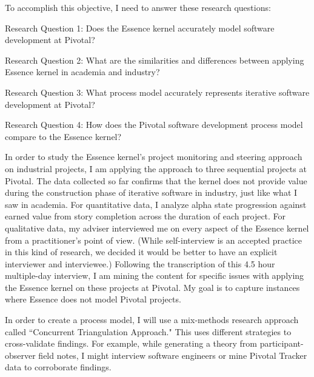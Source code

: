 \documentclass[preprint,12pt,3p]{elsarticle}
\begin{document}
To accomplish this objective, I need to answer these research questions:

Research Question 1: Does the Essence kernel accurately model software development at Pivotal? 

Research Question 2: What are the similarities and differences between applying Essence kernel in academia and industry? 

Research Question 3: What process model accurately represents iterative software development at Pivotal?

Research Question 4: How does the Pivotal software development process model compare to the Essence kernel? 

In order to study the Essence kernel's project monitoring and steering approach on industrial projects, I am applying the approach to three sequential projects at Pivotal. The data collected so far confirms that the kernel does not provide value during the construction phase of iterative software in industry, just like what I saw in academia. For quantitative data, I analyze alpha state progression against earned value from story completion across the duration of each project. For qualitative data, my adviser interviewed me on every aspect of the Essence kernel from a practitioner's point of view. (While self-interview is an accepted practice in this kind of research, we decided it would be better to have an explicit interviewer and interviewee.) Following the transcription of this 4.5 hour multiple-day interview, I am mining the content for specific issues with applying the Essence kernel on these projects at Pivotal. My goal is to capture instances where Essence does not model Pivotal projects. 

In order to create a process model, I will use a mix-methods research approach called ``Concurrent Triangulation Approach." This uses different strategies to cross-validate findings. For example, while generating a theory from participant-observer field notes, I might interview software engineers or mine Pivotal Tracker data to corroborate findings. 
 
\end{document}

